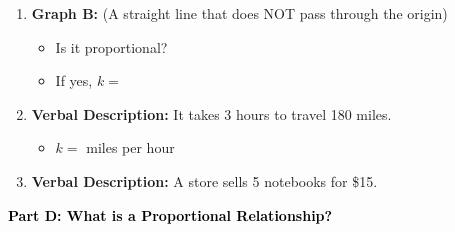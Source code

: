 \documentclass[12pt, letterpaper, fleqn]{article}
\newcommand{\blank}{\underline{\hspace{2.2cm}}}
\begin{document}
\vspace{3mm}

\begin{enumerate}[itemsep=2.2cm, leftmargin=0.6cm, resume]
\begin{itemize}
\item If yes, $k = $ \blank
\end{itemize}
\item \textbf{Graph B:} (A straight line that does NOT pass through the origin)
\begin{center}
\end{center}

\begin{itemize}
\item Is it proportional? \blank
\item If yes, $k = $ \blank
\end{itemize}
\item \textbf{Verbal Description:} It takes 3 hours to travel 180 miles.
\begin{itemize}
\item $k = $ \blank miles per hour
\end{itemize}
\item \textbf{Verbal Description:} A store sells 5 notebooks for \$15.
\end{enumerate}

\newpage

\begin{tcolorbox}[colback=customteal!20]
\large\textcolor{black}{\textbf{Part D: What is a Proportional Relationship?}}
\end{tcolorbox}

\vspace{3mm}
\end{document}
